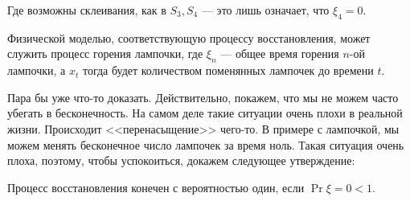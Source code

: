 Где возможны склеивания, как в $S_3, S_4$ --- это лишь означает, что $\xi_4 = 0$.

\begin{example}
  Физической моделью, соответствующую процессу восстановления, может служить
  процесс горения лампочки,
  где $\xi_n$ --- общее время горения $n$-ой лампочки, а $x_t$ тогда будет количеством
  поменянных лампочек до времени $t$.
\end{example}

Пара бы уже что-то доказать. Действительно, покажем, что мы не можем
часто убегать в бесконечность. На самом деле такие ситуации очень плохи в реальной
жизни. Происходит <<перенасыщение>> чего-то. В примере с лампочкой, мы можем менять
бесконечное число лампочек за время ноль. Такая ситуация очень плоха, поэтому,
чтобы успокоиться, докажем следующее утверждение:

\begin{theorem}
  Процесс восстановления конечен с вероятностью один, если $\Pr{\xi = 0} < 1$.
\end{theorem}


